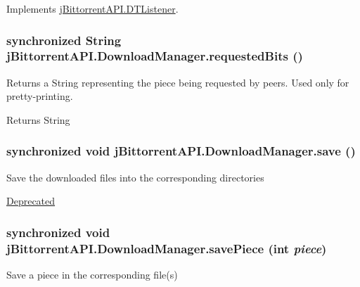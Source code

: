 Implements \hyperlink{interfacej_bittorrent_a_p_i_1_1_d_t_listener}{jBittorrentAPI.DTListener}.\hypertarget{classj_bittorrent_a_p_i_1_1_download_manager_a36b75b950fbf07a4e7b7402eb1bd2307}{
\subsubsection[{requestedBits}]{\setlength{\rightskip}{0pt plus 5cm}synchronized String jBittorrentAPI.DownloadManager.requestedBits ()}}
\label{classj_bittorrent_a_p_i_1_1_download_manager_a36b75b950fbf07a4e7b7402eb1bd2307}
Returns a String representing the piece being requested by peers. Used only for pretty-\/printing. \begin{DoxyReturn}{Returns}
String 
\end{DoxyReturn}
\hypertarget{classj_bittorrent_a_p_i_1_1_download_manager_af5eb8ee54fc43f223e393b3814d0f3e9}{
\subsubsection[{save}]{\setlength{\rightskip}{0pt plus 5cm}synchronized void jBittorrentAPI.DownloadManager.save ()}}
\label{classj_bittorrent_a_p_i_1_1_download_manager_af5eb8ee54fc43f223e393b3814d0f3e9}
Save the downloaded files into the corresponding directories \begin{Desc}
\item[\hyperlink{deprecated__deprecated000001}{Deprecated}]\end{Desc}
\hypertarget{classj_bittorrent_a_p_i_1_1_download_manager_a2fc9b7a2b7466ed76061ec97d7b0d931}{
\subsubsection[{savePiece}]{\setlength{\rightskip}{0pt plus 5cm}synchronized void jBittorrentAPI.DownloadManager.savePiece (int {\em piece})}}
\label{classj_bittorrent_a_p_i_1_1_download_manager_a2fc9b7a2b7466ed76061ec97d7b0d931}
Save a piece in the corresponding file(s) 

